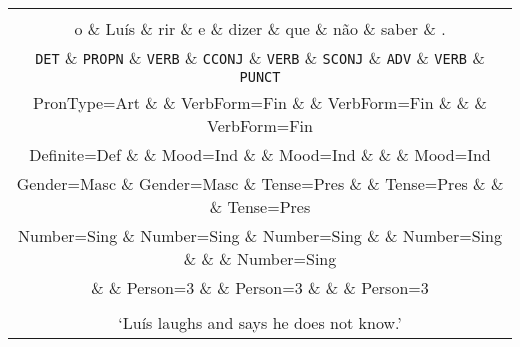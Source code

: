 \documentclass{standalone}  %
\newcommand{\upos}[1]{\texttt{#1}}
\newcommand{\feat}[1]{{\anarfont\footnotesize #1}}
\begin{document}
\begin{tabular}{c}
\begin{dependency}[edge unit distance=3ex]
  \begin{deptext}
    O \& Luís \& ri  \& e \& diz   \& que \& não \& sabe  \& . \\
    o \& Luís \& rir \& e \& dizer \& que \& não \& saber \& . \\
    \upos{DET} \& \upos{PROPN} \& \upos{VERB} \& \upos{CCONJ} \& \upos{VERB} \& \upos{SCONJ} \& \upos{ADV} \& \upos{VERB} \& \upos{PUNCT} \\
    \feat{PronType=Art} \&                    \& \feat{VerbForm=Fin} \& \& \feat{VerbForm=Fin} \& \& \& \feat{VerbForm=Fin} \\
    \feat{Definite=Def} \&                    \& \feat{Mood=Ind}     \& \& \feat{Mood=Ind}     \& \& \& \feat{Mood=Ind}     \\
    \feat{Gender=Masc}  \& \feat{Gender=Masc} \& \feat{Tense=Pres}   \& \& \feat{Tense=Pres}   \& \& \& \feat{Tense=Pres}   \\
    \feat{Number=Sing}  \& \feat{Number=Sing} \& \feat{Number=Sing}  \& \& \feat{Number=Sing}  \& \& \& \feat{Number=Sing}  \\
                        \&                    \& \feat{Person=3}     \& \& \feat{Person=3}     \& \& \& \feat{Person=3}     \\
  \end{deptext}
  \deproot[edge unit distance=3.75ex]{3}{root}
  \depedge{2}{1}{det}
  \depedge{3}{2}{nsubj}
  \depedge[edge unit distance=2ex]{3}{9}{punct}
  \depedge{3}{5}{conj}
  \depedge{5}{4}{cc}
  \depedge{5}{8}{ccomp}
  \depedge{8}{6}{mark}
  \depedge{8}{7}{advmod}
\end{dependency} \\
`Luís laughs and says he does not know.' \\
\end{tabular}
\end{document}

